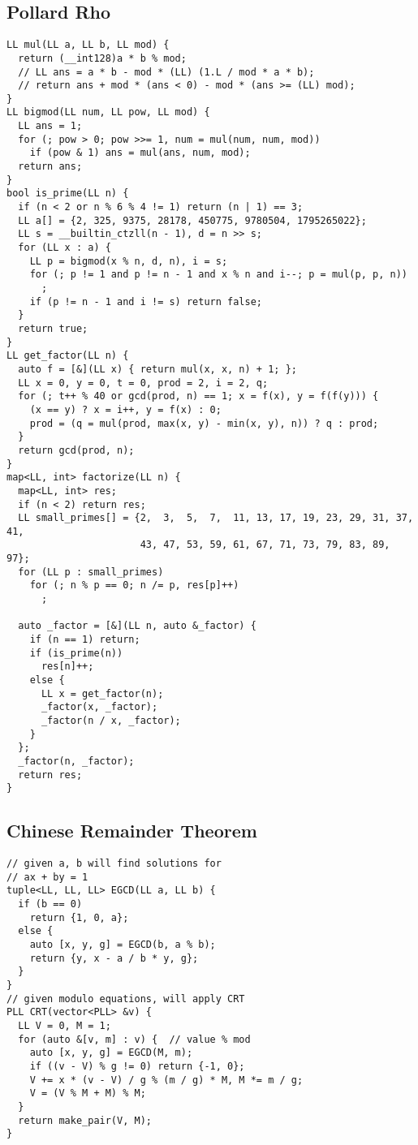 \documentclass[FSZ,a4paper,onesided]{article}
\begin{document}
\begin{multicols*}{\COLS}
\begin{lstlisting}
\end{lstlisting}
\subsection{Pollard Rho}
\begin{lstlisting}
LL mul(LL a, LL b, LL mod) {
  return (__int128)a * b % mod;
  // LL ans = a * b - mod * (LL) (1.L / mod * a * b);
  // return ans + mod * (ans < 0) - mod * (ans >= (LL) mod);
}
LL bigmod(LL num, LL pow, LL mod) {
  LL ans = 1;
  for (; pow > 0; pow >>= 1, num = mul(num, num, mod))
    if (pow & 1) ans = mul(ans, num, mod);
  return ans;
}
bool is_prime(LL n) {
  if (n < 2 or n % 6 % 4 != 1) return (n | 1) == 3;
  LL a[] = {2, 325, 9375, 28178, 450775, 9780504, 1795265022};
  LL s = __builtin_ctzll(n - 1), d = n >> s;
  for (LL x : a) {
    LL p = bigmod(x % n, d, n), i = s;
    for (; p != 1 and p != n - 1 and x % n and i--; p = mul(p, p, n))
      ;
    if (p != n - 1 and i != s) return false;
  }
  return true;
}
LL get_factor(LL n) {
  auto f = [&](LL x) { return mul(x, x, n) + 1; };
  LL x = 0, y = 0, t = 0, prod = 2, i = 2, q;
  for (; t++ % 40 or gcd(prod, n) == 1; x = f(x), y = f(f(y))) {
    (x == y) ? x = i++, y = f(x) : 0;
    prod = (q = mul(prod, max(x, y) - min(x, y), n)) ? q : prod;
  }
  return gcd(prod, n);
}
map<LL, int> factorize(LL n) {
  map<LL, int> res;
  if (n < 2) return res;
  LL small_primes[] = {2,  3,  5,  7,  11, 13, 17, 19, 23, 29, 31, 37, 41,
                       43, 47, 53, 59, 61, 67, 71, 73, 79, 83, 89, 97};
  for (LL p : small_primes)
    for (; n % p == 0; n /= p, res[p]++)
      ;

  auto _factor = [&](LL n, auto &_factor) {
    if (n == 1) return;
    if (is_prime(n))
      res[n]++;
    else {
      LL x = get_factor(n);
      _factor(x, _factor);
      _factor(n / x, _factor);
    }
  };
  _factor(n, _factor);
  return res;
}
\end{lstlisting}
\subsection{Chinese Remainder Theorem}
\begin{lstlisting}
// given a, b will find solutions for
// ax + by = 1
tuple<LL, LL, LL> EGCD(LL a, LL b) {
  if (b == 0)
    return {1, 0, a};
  else {
    auto [x, y, g] = EGCD(b, a % b);
    return {y, x - a / b * y, g};
  }
}
// given modulo equations, will apply CRT
PLL CRT(vector<PLL> &v) {
  LL V = 0, M = 1;
  for (auto &[v, m] : v) {  // value % mod
    auto [x, y, g] = EGCD(M, m);
    if ((v - V) % g != 0) return {-1, 0};
    V += x * (v - V) / g % (m / g) * M, M *= m / g;
    V = (V % M + M) % M;
  }
  return make_pair(V, M);
}
\end{lstlisting}

\end{multicols*}
\end{document}
